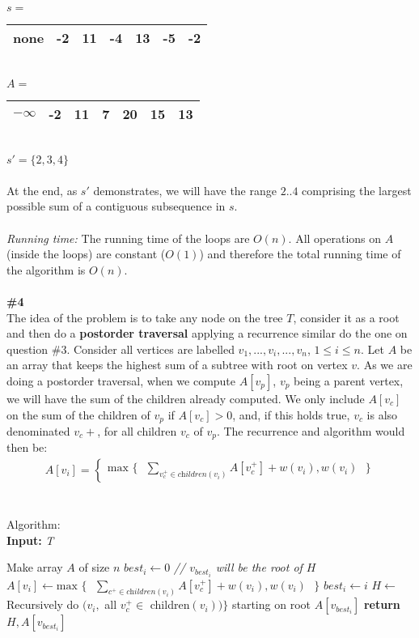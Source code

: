 \documentclass{article}
\begin{document}
$s = $
\begin{tabular}{ |c|c|c|c|c|c|c| } 
 \hline
 none & -2 & 11 & -4 & 13 & -5 & -2 \\
 \hline
\end{tabular}
\\
$A = $
\begin{tabular}{ |c|c|c|c|c|c|c| } 
 \hline
 $-\infty$ & -2 & 11 & 7 & \textbf{20} & 15 & 13 \\
 \hline
\end{tabular}
\\
$s' = \{ 2, 3, 4\}$
\\
\\
At the end, as $s'$ demonstrates, we will have the range $2..4$ comprising the largest possible sum of a contiguous subsequence in $s$.
\\
\\
\textit{Running time:} The running time of the loops are $O(n)$. All operations on $A$ (inside the loops) are constant ($O(1)$) and therefore the total running time of the algorithm is $O(n)$.
\\
\\
\textbf{\#4}
\\
The idea of the problem is to take any node on the tree $T$, consider it as a root and then do a \textbf{postorder traversal} applying a recurrence similar do the one on question $\#3$. Consider all vertices are labelled $v_1, ..., v_i, ..., v_n$, $1 \leq i \leq n$. Let $A$ be an array that keeps the highest sum of a subtree with root on vertex $v$. As we are doing a postorder traversal, when we compute $A[v_p]$,  $v_p$ being a parent vertex, we will have the sum of the children already computed. We only include $A[v_c]$ on the sum of the children of $v_p$ if $A[v_c] > 0$, and, if this holds true, $v_c$ is also denominated $v_c{+}$, for all children $v_c$ of $v_p$. The recurrence and algorithm would then be:
\\
\begin{gather*}
A[v_i] =
\begin{cases}
\text{max } \{ \text{ } \sum_{v_c^{+} \in \textit{children} (v_i)} A[v_c^{+}] + w(v_i) , w(v_i) \text{ } \}
\end{cases}
\end{gather*}\\
\\
Algorithm:\\
\textbf{Input:} \textit{T}
\begin{algorithmic}
\State Make array $A$ of size $n$
\State $best_i \gets 0$ \textit{// $v_{best_i}$ will be the root of $H$}
  \State $A[v_i] \gets \text{max } \{ \text{ } \sum_{c^{+} \in \textit{children} (v_i)} A[v_c^{+}] + w(v_i) , w(v_i) \text{ } \}$
    \State $best_i \gets i$
  \EndIf
\EndFor
\State $H \gets$ Recursively do $(v_i, $ all $v_c^{+} \in $ children$(v_i))\}$ starting on root $A[v_{best_i}]$
\State \textbf{return} $H, A[v_{best_i}]$\\
\end{algorithmic}
\end{document}
